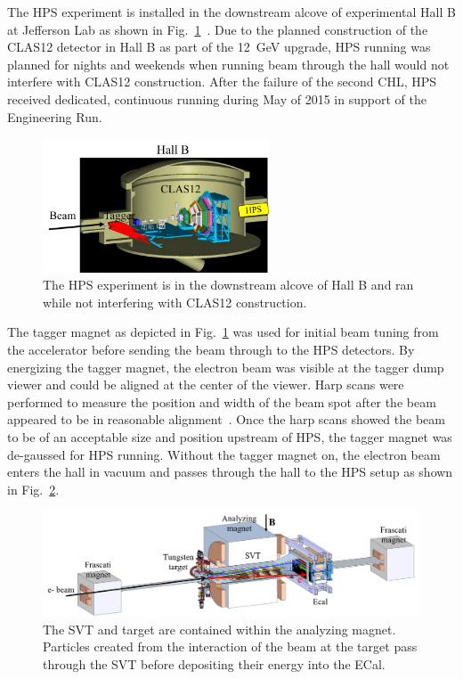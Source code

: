 The HPS experiment is installed in the downstream alcove of experimental Hall B at Jefferson Lab as shown in Fig.~\ref{Figure:hallB}~\cite{Takashi}. Due to the planned construction of the CLAS12 detector in Hall B as part of the 12~GeV upgrade, HPS running was planned for nights and weekends when running beam through the hall would not interfere with CLAS12 construction. After the failure of the second CHL, HPS received dedicated, continuous running during May of 2015 in support of the Engineering Run. 

\begin{figure}[H]
  \centering
      \includegraphics[width=0.6\textwidth]{pics/experiment/hallB.png}
  \caption[HPS location in Hall B]{The HPS experiment is in the downstream alcove of Hall B and ran while not interfering with CLAS12 construction.}
  \label{Figure:hallB}
\end{figure}

The tagger magnet as depicted in Fig.~\ref{Figure:hallB} was used for initial beam tuning from the accelerator before sending the beam through to the HPS detectors. By energizing the tagger magnet, the electron beam was visible at the tagger dump viewer and could be aligned at the center of the viewer. Harp scans were performed to measure the position and width of the beam spot after the beam appeared to be in reasonable alignment~\cite{Takashi}. Once the harp scans showed the beam to be of an acceptable size and position upstream of HPS, the tagger magnet was de-gaussed for HPS running. Without the tagger magnet on, the electron beam enters the hall in vacuum and passes through the hall to the HPS setup as shown in Fig.~\ref{Figure:hpsBeamline}. 

\begin{figure}[H]
  \centering
      \includegraphics[width=1.0\textwidth]{pics/experiment/hpsBeamline.png}
  \caption[HPS beamline]{The SVT and target are contained within the analyzing magnet. Particles created from the interaction of the beam at the target pass through the SVT before depositing their energy into the ECal.}
  \label{Figure:hpsBeamline}
\end{figure}


